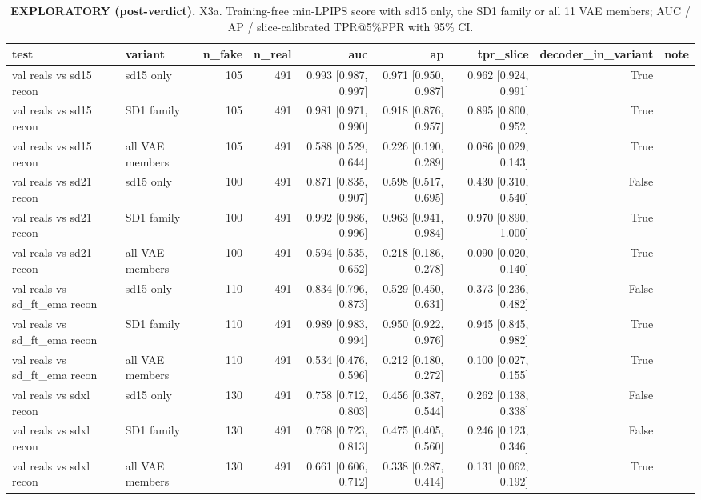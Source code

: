 \begin{table}[htbp]
\centering
\scriptsize
\caption{\textbf{EXPLORATORY (post-verdict).} X3a. Training-free min-LPIPS score with sd15 only, the SD1 family or all 11 VAE members; AUC / AP / slice-calibrated TPR@5\%FPR with 95\% CI.}
\label{tab:x3a-min-lpips}
\begin{tabular}{llrrrrrrr}
\toprule
test & variant & n\_fake & n\_real & auc & ap & tpr\_slice & decoder\_in\_variant & note \\
\midrule
val reals vs sd15 recon & sd15 only & 105 & 491 & 0.993 [0.987, 0.997] & 0.971 [0.950, 0.987] & 0.962 [0.924, 0.991] & True &  \\
val reals vs sd15 recon & SD1 family & 105 & 491 & 0.981 [0.971, 0.990] & 0.918 [0.876, 0.957] & 0.895 [0.800, 0.952] & True &  \\
val reals vs sd15 recon & all VAE members & 105 & 491 & 0.588 [0.529, 0.644] & 0.226 [0.190, 0.289] & 0.086 [0.029, 0.143] & True &  \\
val reals vs sd21 recon & sd15 only & 100 & 491 & 0.871 [0.835, 0.907] & 0.598 [0.517, 0.695] & 0.430 [0.310, 0.540] & False &  \\
val reals vs sd21 recon & SD1 family & 100 & 491 & 0.992 [0.986, 0.996] & 0.963 [0.941, 0.984] & 0.970 [0.890, 1.000] & True &  \\
val reals vs sd21 recon & all VAE members & 100 & 491 & 0.594 [0.535, 0.652] & 0.218 [0.186, 0.278] & 0.090 [0.020, 0.140] & True &  \\
val reals vs sd\_ft\_ema recon & sd15 only & 110 & 491 & 0.834 [0.796, 0.873] & 0.529 [0.450, 0.631] & 0.373 [0.236, 0.482] & False &  \\
val reals vs sd\_ft\_ema recon & SD1 family & 110 & 491 & 0.989 [0.983, 0.994] & 0.950 [0.922, 0.976] & 0.945 [0.845, 0.982] & True &  \\
val reals vs sd\_ft\_ema recon & all VAE members & 110 & 491 & 0.534 [0.476, 0.596] & 0.212 [0.180, 0.272] & 0.100 [0.027, 0.155] & True &  \\
val reals vs sdxl recon & sd15 only & 130 & 491 & 0.758 [0.712, 0.803] & 0.456 [0.387, 0.544] & 0.262 [0.138, 0.338] & False &  \\
val reals vs sdxl recon & SD1 family & 130 & 491 & 0.768 [0.723, 0.813] & 0.475 [0.405, 0.560] & 0.246 [0.123, 0.346] & False &  \\
val reals vs sdxl recon & all VAE members & 130 & 491 & 0.661 [0.606, 0.712] & 0.338 [0.287, 0.414] & 0.131 [0.062, 0.192] & True &  \\

\end{tabular}
\end{table}
